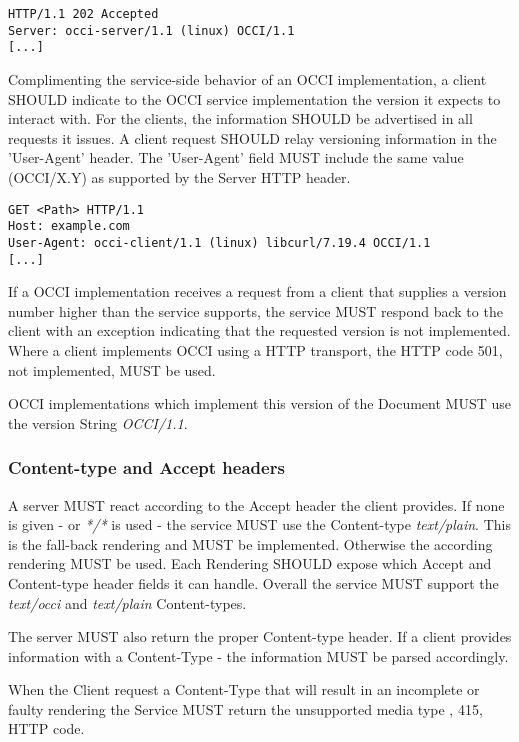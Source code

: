 \documentclass[10pt,a4paper]{article}
\begin{document}
\begin{verbatim}
HTTP/1.1 202 Accepted
Server: occi-server/1.1 (linux) OCCI/1.1
[...]
\end{verbatim}

Complimenting the service-side behavior of an OCCI implementation, a
client SHOULD indicate to the OCCI service implementation the version
it expects to interact with. For the clients, the information SHOULD
be advertised in all requests it issues. A client request SHOULD
relay versioning information in the 'User-Agent' header. The
'User-Agent' field MUST include the same value (OCCI/X.Y) as supported
by the Server HTTP header.

\begin{verbatim}
GET <Path> HTTP/1.1
Host: example.com
User-Agent: occi-client/1.1 (linux) libcurl/7.19.4 OCCI/1.1
[...]
\end{verbatim}

If a OCCI implementation receives a request from a client that
supplies a version number higher than the service supports, the
service MUST respond back to the client with an exception indicating
that the requested version is not implemented. Where a client
implements OCCI using a HTTP transport, the HTTP code 501, not
implemented, MUST be used.

OCCI implementations which implement this version of the Document MUST
use the version String \emph{OCCI/1.1}.

\subsubsection{Content-type and Accept headers}
A server MUST react according to the Accept header the client
provides. If none is given - or \textit{*/*} is used - the service MUST
use the Content-type \emph{text/plain}. This is the fall-back
rendering and MUST be implemented. Otherwise the according rendering
MUST be used. Each Rendering SHOULD expose which Accept and
Content-type header fields it can handle. Overall the service MUST
support the \textit{text/occi} and \textit{text/plain} Content-types.

The server MUST also return the proper Content-type header. If a
client provides information with a Content-Type - the information MUST
be parsed accordingly.

When the Client request a Content-Type that will result in an
incomplete or faulty rendering the Service MUST return the unsupported
media type , 415, HTTP code.
\end{document}
